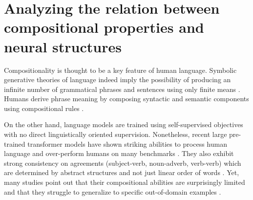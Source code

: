 \setchapterpreamble[u]{\margintoc}
\chapter{Analyzing the relation between compositional properties and neural structures}


Compositionality is thought to be a key feature of human language. Symbolic generative theories of language indeed imply the possibility of producing an infinite number of grammatical phrases and sentences using only finite means \parencite{chomsky_57, montague_70, hauser_02}. Humans derive phrase meaning by composing syntactic and semantic components using compositional rules \parencite{partee_84, cann_93, dowty_07}. %

On the other hand, language models are trained using self-supervised objectives with no direct linguistically oriented supervision. Nonetheless, recent large pre-trained transformer models have shown striking abilities to process human language and over-perform humans on many benchmarks \parencite{devlin_19, brown_20}. They also exhibit strong consistency on agreements (subject-verb, noun-adverb, verb-verb) which are determined by abstract structures and not just linear order of words \parencite{linzen_16, gulordava_18, marvin_18, newman_21}. Yet, many studies point out that their compositional abilities are surprisingly limited and that they struggle to generalize to specific out-of-domain examples \parencite{lake_18, kim_20, hupkes_20}. 

